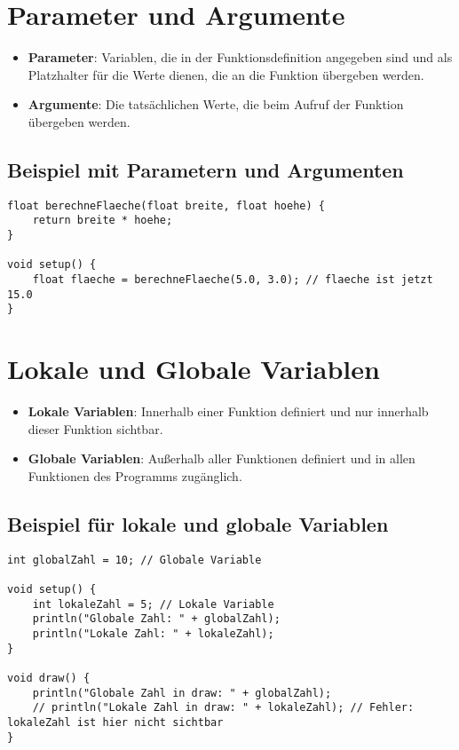 \documentclass{article}
\begin{document}
\section*{Parameter und Argumente}

\begin{itemize}
    \item \textbf{Parameter}: Variablen, die in der Funktionsdefinition angegeben sind und als Platzhalter für die Werte dienen, die an die Funktion übergeben werden.
    \item \textbf{Argumente}: Die tatsächlichen Werte, die beim Aufruf der Funktion übergeben werden.
\end{itemize}

\subsection*{Beispiel mit Parametern und Argumenten}

\begin{lstlisting}
float berechneFlaeche(float breite, float hoehe) {
    return breite * hoehe;
}

void setup() {
    float flaeche = berechneFlaeche(5.0, 3.0); // flaeche ist jetzt 15.0
}
\end{lstlisting}

\section*{Lokale und Globale Variablen}

\begin{itemize}
    \item \textbf{Lokale Variablen}: Innerhalb einer Funktion definiert und nur innerhalb dieser Funktion sichtbar.
    \item \textbf{Globale Variablen}: Außerhalb aller Funktionen definiert und in allen Funktionen des Programms zugänglich.
\end{itemize}

\subsection*{Beispiel für lokale und globale Variablen}

\begin{lstlisting}
int globalZahl = 10; // Globale Variable

void setup() {
    int lokaleZahl = 5; // Lokale Variable
    println("Globale Zahl: " + globalZahl);
    println("Lokale Zahl: " + lokaleZahl);
}

void draw() {
    println("Globale Zahl in draw: " + globalZahl);
    // println("Lokale Zahl in draw: " + lokaleZahl); // Fehler: lokaleZahl ist hier nicht sichtbar
}
\end{lstlisting}
\end{document}
